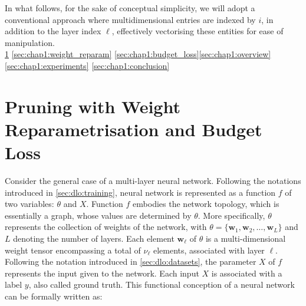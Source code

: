 In what follows, for the sake of conceptual simplicity, we will adopt a
conventional approach where multidimensional \DIFdelbegin {}\DIFdelend \DIFaddbegin {}\DIFaddend entries are indexed by $i$,
in addition to the layer index $\ell$, effectively vectorising these entities
for ease of manipulation. \\

\DIFaddbegin {}\cref{sec:chap1:pruning}
\cref{sec:chap1:weight_reparam} \cref{sec:chap1:budget_loss}\cref{sec:chap1:overview}\cref{sec:chap1:experiments} \cref{sec:chap1:conclusion} \\
\DIFaddend 





\section{Pruning with Weight Reparametrisation and Budget Loss}\label{sec:chap1:pruning}
Consider the general case of a multi-layer neural network. Following the
notations introduced in \cref{sec:dlo:training}, \DIFdelbegin {}\DIFdelend \DIFaddbegin {}\DIFaddend neural network is represented
as a function $f$ of two variables: $\theta$ and $X$. Function $f$ embodies the
network topology, which is essentially a graph, whose \DIFdelbegin {}\DIFdelend \DIFaddbegin {}\DIFaddend values are
determined by $\theta$. More specifically, $\theta$ represents the collection of
weights of the network, with $\theta = \{\mathbf{w}_1, \mathbf{w}_2, \ldots,
\mathbf{w}_L\}$ and $L$ denoting the number of layers. Each element
$\mathbf{w}_\ell$ of $\theta$ is a multi-dimensional weight tensor encompassing
a total of $\nu_\ell$ elements, associated with layer $\ell$. Following the
notation introduced in \cref{sec:dlo:datasets}, the parameter $X$ of $f$
represents the input given to the network. Each input $X$ is associated with a
label $y$, also called ground truth. This functional conception of a neural
network can be formally written as:\\

